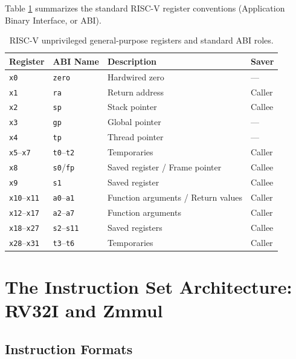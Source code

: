 Table \ref{tab:riscv_abi_registers} summarizes the standard RISC-V register conventions (Application Binary Interface, or ABI).

\begin{table}[htbp]
\centering
\small
\begin{tabular}{|l|l|l|l|}
\hline
\textbf{Register} & \textbf{ABI Name} & \textbf{Description} & \textbf{Saver} \\
\hline
\texttt{x0}       & \texttt{zero}     & Hardwired zero & --- \\
\texttt{x1}       & \texttt{ra}       & Return address & Caller \\
\texttt{x2}       & \texttt{sp}       & Stack pointer & Callee \\
\texttt{x3}       & \texttt{gp}       & Global pointer & --- \\
\texttt{x4}       & \texttt{tp}       & Thread pointer & --- \\
\texttt{x5}--\texttt{x7}   & \texttt{t0}--\texttt{t2}   & Temporaries & Caller \\
\texttt{x8}       & \texttt{s0}/\texttt{fp} & Saved register / Frame pointer & Callee \\
\texttt{x9}       & \texttt{s1}       & Saved register & Callee \\
\texttt{x10}--\texttt{x11} & \texttt{a0}--\texttt{a1}   & Function arguments / Return values & Caller \\
\texttt{x12}--\texttt{x17} & \texttt{a2}--\texttt{a7}   & Function arguments & Caller \\
\texttt{x18}--\texttt{x27} & \texttt{s2}--\texttt{s11}  & Saved registers & Callee \\
\texttt{x28}--\texttt{x31} & \texttt{t3}--\texttt{t6}   & Temporaries & Caller \\
\hline
\end{tabular}
\caption{RISC-V unprivileged general-purpose registers and standard ABI roles.}\label{tab:riscv_abi_registers}
\end{table}


\section{The Instruction Set Architecture: RV32I and Zmmul}\label{riscvISA}

\subsection{Instruction Formats}

